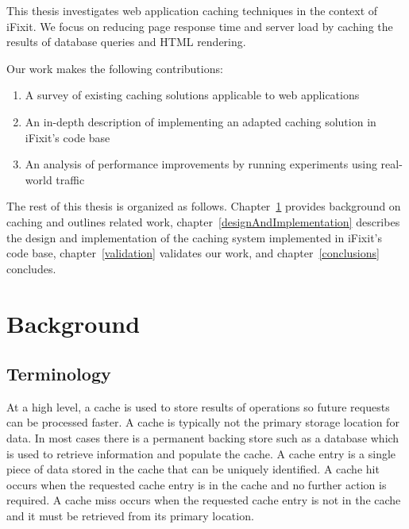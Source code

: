 \documentclass[12pt]{ucthesis}
\begin{document}
This thesis investigates web application caching techniques in the context of \textsf{iFixit}.
We focus on reducing page response time and server load by caching the results of database queries and HTML rendering.

Our work makes the following contributions:

\begin{enumerate}
   \item A survey of existing caching solutions applicable to web applications
   \item An in-depth description of implementing an adapted caching solution in \textsf{iFixit}'s code base
   \item An analysis of performance improvements by running experiments using real-world traffic
\end{enumerate}

The rest of this thesis is organized as follows.
Chapter~\ref{background} provides background on caching and outlines related work, chapter~\ref{designAndImplementation} describes the design and implementation of the caching system implemented in \textsf{iFixit}'s code base, chapter~\ref{validation} validates our work, and chapter~\ref{conclusions} concludes.


\chapter{Background} \label{background}
\section{Terminology}
At a high level, a cache is used to store results of operations so future requests can be processed faster.
A cache is typically not the primary storage location for data.
In most cases there is a permanent backing store such as a database which is used to retrieve information and populate the cache.
A cache entry is a single piece of data stored in the cache that can be uniquely identified.
A cache hit occurs when the requested cache entry is in the cache and no further action is required.
A cache miss occurs when the requested cache entry is not in the cache and it must be retrieved from its primary location.
\end{document}
